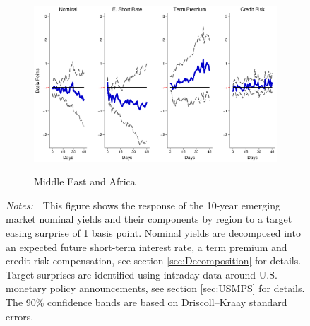 \documentclass[a4paper, 12pt]{article}
\newcommand{\figtext}[1]{
	\vspace{-1ex}
	\captionsetup{justification=justified,font=footnotesize}
	\caption*{#1}
}
\newcommand{\fignotes}[1]{\figtext{\emph{Notes:~}~#1}}
\begin{document}
\begin{appendices}
\begin{landscape}
\begin{figure}[tbph]
\begin{center}
\begin{minipage}{\linewidth}
\begin{center}
						\begin{subfigure}[t]{\linewidth}
							\includegraphics[trim={0cm 0cm 0cm 0cm},clip,height=0.35\textheight,width=\linewidth]{../Figures/TargetMAnomyptpphi120m.eps} \\
							\vspace{-0.35cm}
							\caption{Middle East and Africa} \label{subfig:LPMA10Ytarget}
						\end{subfigure}
						\vspace{-0.45cm}
					\end{center}
					\fignotes{This figure shows the response of the 10-year emerging market nominal yields and their components by region to a target easing surprise of 1 basis point. Nominal yields are decomposed into an expected future short-term interest rate, a term premium and credit risk compensation, see section \ref{sec:Decomposition} for details. Target surprises are identified using intraday data around U.S. monetary policy announcements, see section \ref{sec:USMPS} for details. The 90\% confidence bands are based on Driscoll--Kraay standard errors.}
				\end{minipage}
			\end{center}
		\end{figure}
		
		\pagebreak[4]
		

\end{landscape}
\end{appendices}
\end{document}
